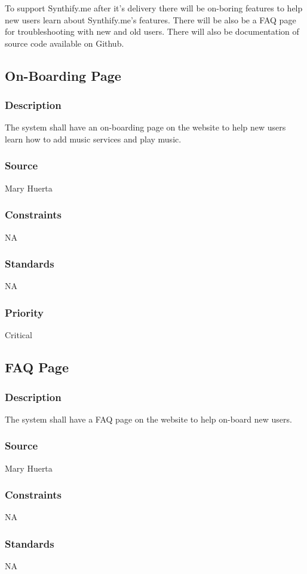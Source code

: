 To support Synthify.me after it's delivery there will be on-boring features to help new users learn about Synthify.me's features. There will be also be a FAQ page for troubleshooting with new and old users. There will also be documentation of source code available on Github.  

\subsection{On-Boarding Page}
\subsubsection{Description}
The system shall have an on-boarding page on the website to help new users learn how to add music services and play music.
\subsubsection{Source}
Mary Huerta
\subsubsection{Constraints}
NA
\subsubsection{Standards}
NA
\subsubsection{Priority}
Critical

\subsection{FAQ Page}
\subsubsection{Description}
The system shall have a FAQ page on the website to help on-board new users.
\subsubsection{Source}
Mary Huerta
\subsubsection{Constraints}
NA
\subsubsection{Standards}
NA
